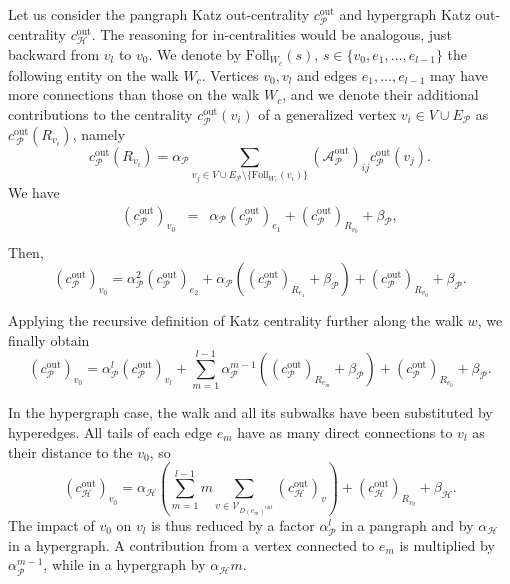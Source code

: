 \documentclass[a4paper,12pt]{article}
\theoremstyle{definition}
\theoremstyle{remark}
\newcommand{\mH}{\mathcal{H}}
\newcommand{\mP}{\mathcal{P}}
\newcommand{\out}{\mathrm{out}}
\begin{document}
Let us consider the pangraph Katz out-centrality $c_{\mP}^{\out}$ and hypergraph Katz out-centrality $c_{\mH}^{\out}$. The reasoning for in-centralities would be analogous, just backward from $v_l$ to $v_0$. We denote by $\textrm{Foll}_{W_c}(s)$, $s\in \{v_0,e_1,\ldots, e_{l-1}\}$ the following entity on the walk $W_c$. Vertices $v_0, v_l$ and edges $e_1, \ldots, e_{l-1}$ may have more connections than those on the walk $W_c$, and we denote their additional contributions to the centrality $c_{\mP}^{\out}(v_i)$ of a generalized vertex $v_i\in V\cup E_{\mP}$ as $c_{\
\mP}^{\out}(R_{v_i})$, namely
\begin{equation*}
c_{\mP}^{\out}(R_{v_i})=\alpha_{\mP}\sum_{v_j\in V\cup E_{\mP}\setminus \{\textrm{Foll}_{W_c}(v_i)\}}(\mathcal{A}_{\mP}^{\out})_{ij} c_{\mP}^{\out}(v_j).
\end{equation*}
 We have
\begin{eqnarray*}
    (c_{\mP}^{\out})_{v_0}&=&\alpha_{\mP} (c_{\mP}^{\out})_{e_1} + (c_{\mP}^{\out})_{R_{v_0}} + \beta_{\mP},\\
\end{eqnarray*}
 Then,
\begin{equation}
    (c_{\mP}^{\out})_{v_0}=\alpha_{\mP}^2  (c_{\mP}^{\out})_{e_2}  + \alpha_{\mP}  \left(  (c_{\mP}^{\out})_{R_{e_1}}+ \beta_{\mP} \right) + (c_{\mP}^{\out})_{R_{v_0}} + \beta_{\mP} .
\end{equation}

Applying the recursive definition of Katz centrality further along the walk $w$, we finally obtain
\begin{equation}\label{eq:pangraph_Katz_walk}
    (c_{\mP}^{\out})_{v_0}=\alpha_{\mP}^l (c_{\mP}^{\out})_{v_l}+ \sum_{m=1}^{l-1} \alpha_{\mP} ^{m-1} \left(  (c_{\mP}^{\out})_{R_{e_m}} + \beta_{\mP} \right) + (c_{\mP}^{\out})_{R_{v_0}} + \beta_{\mP} .
\end{equation}%

In the hypergraph case, the walk and all its subwalks have been substituted by hyperedges. All tails of each edge $e_m$ have as many direct connections to $v_l$ as their distance to the $v_0$, so
\begin{equation}\label{eq:hypergraph_Katz_walk}
    (c_{\mH}^{\out})_{v_0}=\alpha_{\mH}  \left(\sum_{m=1}^{l-1} m \sum_{v \in \mathcal{V}_{D(e_m)^{\out}}} (c_{\mH}^{\out})_v\right) + (c_{\mH}^{\out})_{R_{v_0}}+ \beta_{\mH} .
\end{equation}
The impact of $v_0$ on $v_l$ is thus reduced by a factor $\alpha_{\mP}^l$ in a pangraph and by $\alpha_{\mH}$ in a hypergraph. A contribution from a vertex connected to $e_m$ is multiplied by $\alpha_{\mP}^{m-1}$, while in a hypergraph by $\alpha_{\mH}m$. 
\end{document}
